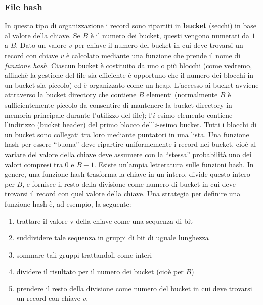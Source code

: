 \subsubsection{File hash}
In questo tipo di organizzazione i record sono ripartiti in \textbf{bucket} (secchi) in base al valore della
chiave. Se $B$ è il numero dei bucket, questi vengono numerati da $1$ a $B$. Dato un valore $v$ per
chiave il numero del bucket in cui deve trovarsi un record con chiave $v$ è calcolato mediante una
funzione che prende il nome di \emph{funzione hash}.
Ciascun bucket è costituito da uno o più blocchi (come vedremo, affinchè la gestione del file sia
efficiente è opportuno che il numero dei blocchi in un bucket sia piccolo) ed è organizzato come un
heap. L'accesso ai bucket avviene attraverso la bucket directory che contiene $B$ elementi
(normalmente $B$ è sufficientemente piccolo da consentire di mantenere la bucket directory in
memoria principale durante l'utilizzo del file); l'$i$-esimo elemento contiene l'indirizzo (bucket
header) del primo blocco dell'$i$-esimo bucket. Tutti i blocchi di un bucket sono collegati tra loro
mediante puntatori in una lista.
Una funzione hash per essere ``buona'' deve ripartire uniformemente i record nei bucket, cioè al
variare del valore della chiave deve assumere con la ``stessa'' probabilità uno dei valori compresi tra
$0$ e $B-1$. Esiste un'ampia letteratura sulle funzioni hash. In genere, una funzione hash trasforma la
chiave in un intero, divide questo intero per $B$, e fornisce il resto della divisione come numero di
bucket in cui deve trovarsi il record con quel valore della chiave. Una strategia per definire una
funzione hash è, ad esempio, la seguente:
\begin{enumerate}
 \item trattare il valore v della chiave come una sequenza di bit
 \item suddividere tale sequenza in gruppi di bit di uguale lunghezza
 \item sommare tali gruppi trattandoli come interi
 \item dividere il risultato per il numero dei bucket (cioè per $B$)
 \item prendere il resto della divisione come numero del bucket in cui deve trovarsi un record con
chiave $v$.
\end{enumerate}

